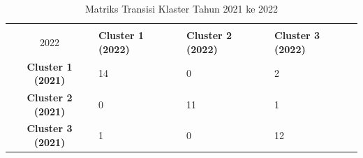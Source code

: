 \begin{table}[H]
\centering
\caption{Matriks Transisi Klaster Tahun 2021 ke 2022} \label{tab:transisi_2021_2022}
\begin{tabular}{|c|p{2cm}|p{2cm}|p{2cm}|}
\hline
\textbf{Tahun 2021 \\ 2022} & \textbf{Cluster 1 (2022)} & \textbf{Cluster 2 (2022)} & \textbf{Cluster 3 (2022)} \\ \hline
\textbf{Cluster 1 (2021)} & 14 & 0 & 2 \\ \hline
\textbf{Cluster 2 (2021)} & 0 & 11 & 1 \\ \hline
\textbf{Cluster 3 (2021)} & 1 & 0 & 12 \\ \hline
\end{tabular}
\end{table}